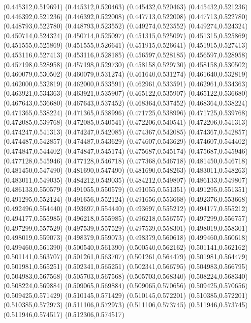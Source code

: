 (0.445312,0.519691)
(0.445312,0.520463)
(0.445432,0.520463)
(0.445432,0.521236)
(0.446392,0.521236)
(0.446392,0.522008)
(0.447713,0.522008)
(0.447713,0.522780)
(0.448793,0.522780)
(0.448793,0.523552)
(0.449274,0.523552)
(0.449274,0.524324)
(0.450714,0.524324)
(0.450714,0.525097)
(0.451315,0.525097)
(0.451315,0.525869)
(0.451555,0.525869)
(0.451555,0.526641)
(0.451915,0.526641)
(0.451915,0.527413)
(0.453116,0.527413)
(0.453116,0.528185)
(0.456597,0.528185)
(0.456597,0.528958)
(0.457198,0.528958)
(0.457198,0.529730)
(0.458158,0.529730)
(0.458158,0.530502)
(0.460079,0.530502)
(0.460079,0.531274)
(0.461640,0.531274)
(0.461640,0.532819)
(0.462000,0.532819)
(0.462000,0.533591)
(0.462961,0.533591)
(0.462961,0.534363)
(0.463921,0.534363)
(0.463921,0.535907)
(0.465122,0.535907)
(0.465122,0.536680)
(0.467643,0.536680)
(0.467643,0.537452)
(0.468364,0.537452)
(0.468364,0.538224)
(0.471365,0.538224)
(0.471365,0.538996)
(0.471725,0.538996)
(0.471725,0.539768)
(0.472085,0.539768)
(0.472085,0.540541)
(0.472206,0.540541)
(0.472206,0.541313)
(0.474247,0.541313)
(0.474247,0.542085)
(0.474367,0.542085)
(0.474367,0.542857)
(0.474487,0.542857)
(0.474487,0.543629)
(0.474607,0.543629)
(0.474607,0.544402)
(0.474847,0.544402)
(0.474847,0.545174)
(0.475687,0.545174)
(0.475687,0.545946)
(0.477128,0.545946)
(0.477128,0.546718)
(0.477368,0.546718)
(0.481450,0.546718)
(0.481450,0.547490)
(0.481690,0.547490)
(0.481690,0.548263)
(0.483011,0.548263)
(0.483011,0.549035)
(0.484212,0.549035)
(0.484212,0.549807)
(0.486133,0.549807)
(0.486133,0.550579)
(0.491055,0.550579)
(0.491055,0.551351)
(0.491295,0.551351)
(0.491295,0.552124)
(0.491656,0.552124)
(0.491656,0.553668)
(0.492376,0.553668)
(0.492496,0.554440)
(0.493697,0.554440)
(0.493697,0.555212)
(0.494177,0.555212)
(0.494177,0.555985)
(0.496218,0.555985)
(0.496218,0.556757)
(0.497299,0.556757)
(0.497299,0.557529)
(0.497539,0.557529)
(0.497539,0.558301)
(0.498019,0.558301)
(0.498019,0.559073)
(0.498379,0.559073)
(0.498379,0.560618)
(0.499460,0.560618)
(0.499460,0.561390)
(0.500540,0.561390)
(0.500540,0.562162)
(0.501141,0.562162)
(0.501141,0.563707)
(0.501261,0.563707)
(0.501261,0.564479)
(0.501981,0.564479)
(0.501981,0.565251)
(0.502341,0.565251)
(0.502341,0.566795)
(0.504983,0.566795)
(0.504983,0.567568)
(0.505703,0.567568)
(0.505703,0.568340)
(0.508224,0.568340)
(0.508224,0.569884)
(0.509065,0.569884)
(0.509065,0.570656)
(0.509425,0.570656)
(0.509425,0.571429)
(0.510145,0.571429)
(0.510145,0.572201)
(0.510385,0.572201)
(0.510385,0.572973)
(0.511106,0.572973)
(0.511106,0.573745)
(0.511946,0.573745)
(0.511946,0.574517)
(0.512306,0.574517)
